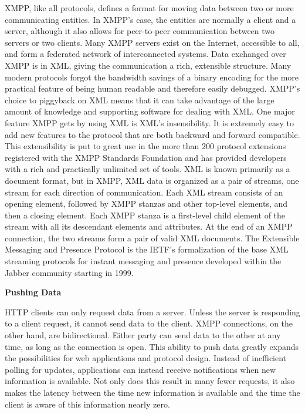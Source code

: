       XMPP, like all protocols, defines a format for moving data between two or more communicating entities. In XMPP’s case, the entities are normally a client and a server, although it also allows for peer-to-peer communication between two servers or two clients. Many XMPP servers exist on the Internet, accessible to all, and form a federated network of interconnected systems. Data exchanged over XMPP is in XML, giving the communication a rich, extensible structure. Many modern protocols forgot the bandwidth savings of a binary encoding for the more practical feature of being human readable and therefore easily debugged. XMPP's choice to piggyback on XML means that it can take advantage of the large amount of knowledge and supporting software for dealing with XML. One major feature XMPP gets by using XML is XML's insensibility. It is extremely easy to add new features to the protocol that are both backward and forward compatible. This extensibility is put to great use in the more than 200 protocol extensions registered with the XMPP Standards Foundation and has provided developers with a rich and practically unlimited set of tools. XML is known primarily as a document format, but in XMPP, XML data is organized as a pair of streams, one stream for each direction of communication. Each XML stream consists of an opening element, followed by XMPP stanzas and other top-level elements, and then a closing element. Each XMPP stanza is a first-level child element of the stream with all its descendant elements and attributes. At the end of an XMPP connection, the two streams form a pair of valid XML documents. The Extensible Messaging and Presence Protocol is the IETF's formalization of the base XML streaming protocols for instant messaging and presence developed within the Jabber community starting in 1999\cite{xmpp}.

      \textbf{Pushing Data}

      HTTP clients can only request data from a server. Unless the server is responding to a client request,
      it cannot send data to the client. XMPP connections, on the other hand, are bidirectional. Either party
      can send data to the other at any time, as long as the connection is open. This ability to push data greatly expands the possibilities for web applications and protocol design. Instead of inefficient polling for updates, applications can instead receive notifications when new information is available. Not only does this result in many fewer requests, it also makes the latency between the time new information is available and the time the client is aware of this information nearly zero.

